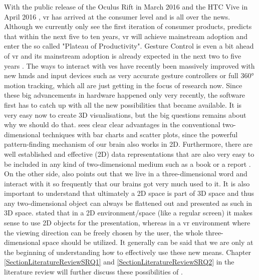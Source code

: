 With the public release of the Oculus Rift in March 2016 \citep{Oculus2016} and the HTC Vive in April 2016 \citep{Htcvive2016}, \gls{vr} has arrived at the consumer level and is all over the news. Although we currently only see the first iteration of consumer products, \cite{Gartner2015} predicts that within the next five to ten years, \gls{vr} will achieve mainstream adoption and enter the so called "Plateau of Productivity". Gesture Control is even a bit ahead of \gls{vr} and its mainstream adoption is already expected in the next two to five years \citep{Gartner2015}. The ways to interact with \glspl{ve} have recently been massively improved with new \glspl{hmd} and input devices such as very accurate gesture controllers or full 360° motion tracking, which all are just getting in the focus of research now. Since these big advancements in hardware happened only very recently, the software first has to catch up with all the new possibilities that became available. It is very easy now to create 3D visualisations, but the big questions remains about why we should do that. \cite{Ware2012} sees clear clear advantages in the conventional two-dimensional techniques with bar charts and scatter plots, since the powerful pattern-finding mechanism of our brain also works in 2D. Furthermore, there are well established and effective (2D) data representations that are also very easy to be included in any kind of two-dimensional medium such as a book or a report \citep{Ware2012}. On the other side, \cite{Ware2012} also points out that we live in a three-dimensional word and interact with it so frequently that our brains got very much used to it. It is also important to understand that ultimately a 2D space is part of 3D space and thus any two-dimensional object can always be flattened out and presented as such in 3D space. \cite{Kwon2015} stated that in a 2D environment/space (like a regular screen) it makes sense to use 2D objects for the presentation, whereas in a \gls{vr} environment where the viewing direction can be freely chosen by the user, the whole three-dimensional space should be utilized. It generally can be said that we are only at the beginning of understanding how to effectively use these new means. Chapter \ref{SectionLiteratureReviewSRQ1} and \ref{SectionLiteratureReviewSRQ2} in the literature review will further discuss these possibilities of .

